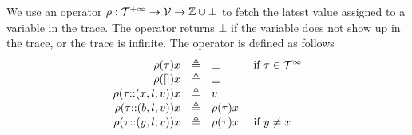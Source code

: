 

We use an operator $\rho: {\mathcal{T}^{+\infty}} \to \mathcal{V} \to \mathbb{Z}\cup\bot$ to fetch the latest value assigned to a variable in the trace. The operator returns $\bot$ if the variable does not show up in the trace, or the trace is infinite. The operator is defined as follows
    \[
\begin{array}{rcll}
\rho(\mathtt{\tau} ) x &\triangleq& \bot &~ \text{if}~ \mathtt{\tau} \in \mathcal{T}^{\infty}\\
 \rho({[]} ) x &\triangleq& \bot&\\
\rho(\mathtt{\tau}  {\small ::} (x, l, v)) x &\triangleq& v
\\
\rho(\mathtt{\tau} {\small ::} (b, l, v)) x &\triangleq& \rho(\mathtt{\tau}) x
\\
\rho(\mathtt{\tau} {\small ::} (y, l, v)) x &\triangleq& \rho(\mathtt{\tau}) x & ~ \text{if}~ y \neq x
\end{array}
\]
 


